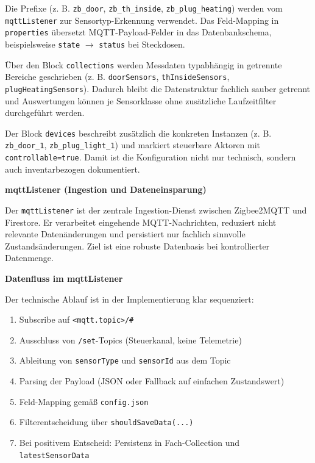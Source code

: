 Die Prefixe (z. B. \texttt{zb\_door}, \texttt{zb\_th\_inside}, \texttt{zb\_plug\_heating}) werden vom \texttt{mqttListener} zur Sensortyp-Erkennung verwendet. Das Feld-Mapping in \texttt{properties} übersetzt MQTT-Payload-Felder in das Datenbankschema, beispielsweise \texttt{state} $\rightarrow$ \texttt{status} bei Steckdosen.

Über den Block \texttt{collections} werden Messdaten typabhängig in getrennte Bereiche geschrieben (z. B. \texttt{doorSensors}, \texttt{thInsideSensors}, \texttt{plugHeatingSensors}). Dadurch bleibt die Datenstruktur fachlich sauber getrennt und Auswertungen können je Sensorklasse ohne zusätzliche Laufzeitfilter durchgeführt werden.

Der Block \texttt{devices} beschreibt zusätzlich die konkreten Instanzen (z. B. \texttt{zb\_door\_1}, \texttt{zb\_plug\_light\_1}) und markiert steuerbare Aktoren mit \texttt{controllable=true}. Damit ist die Konfiguration nicht nur technisch, sondern auch inventarbezogen dokumentiert.

\textbf{mqttListener (Ingestion und Dateneinsparung)}


Der \texttt{mqttListener} ist der zentrale Ingestion-Dienst zwischen Zigbee2MQTT und Firestore. Er verarbeitet eingehende MQTT-Nachrichten, reduziert nicht relevante Datenänderungen und persistiert nur fachlich sinnvolle Zustandsänderungen. Ziel ist eine robuste Datenbasis bei kontrollierter Datenmenge.

\textbf{Datenfluss im mqttListener}

Der technische Ablauf ist in der Implementierung klar sequenziert:

\begin{enumerate}
    \item Subscribe auf \texttt{<mqtt.topic>/\#}
    \item Ausschluss von \texttt{/set}-Topics (Steuerkanal, keine Telemetrie)
    \item Ableitung von \texttt{sensorType} und \texttt{sensorId} aus dem Topic
    \item Parsing der Payload (JSON oder Fallback auf einfachen Zustandswert)
    \item Feld-Mapping gemäß \texttt{config.json}
    \item Filterentscheidung über \texttt{shouldSaveData(...)}
    \item Bei positivem Entscheid: Persistenz in Fach-Collection und \texttt{latestSensorData}
\end{enumerate}

